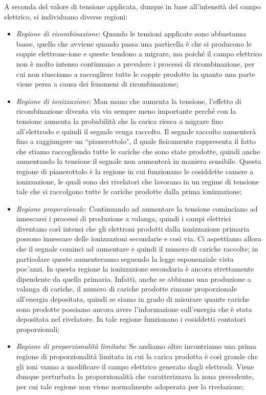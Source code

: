 A seconda del valore di tensione applicata, dunque in base all'intensità del campo elettrico, si individuano diverse regioni:

\begin{itemize}[leftmargin=0.5cm]
   \item \textit{Regione di ricombinazione}: Quando le tensioni applicate sono abbastanza basse, quello che avviene quando passa una particella è che si producono le coppie elettrone-ione e queste tendono a migrare, ma poiché il campo elettrico non è molto intenso continuano a prevalere i processi di ricombinazione, per cui non riusciamo a raccogliere tutte le coppie prodotte in quanto una parte viene persa a causa dei fenomeni di ricombinazione;
   \item \textit{Regione di ionizzazione}: Man mano che aumenta la tensione, l'effetto di ricombinazione diventa via via sempre meno importante perché con la tensione aumenta la probabilità che la carica riesca a migrare fino all'elettrodo e quindi il segnale venga raccolto. Il segnale raccolto aumenterà fino a raggiungere un ``pianerottolo", il quale fisicamente rappresenta il fatto che stiamo raccogliendo tutte le cariche che sono state prodotte, quindi anche aumentando la tensione il segnale non aumenterà in maniera sensibile. Questa regione di pianerottolo è la regione in cui funzionano le cosiddette camere a ionizzazione, le quali sono dei rivelatori che lavorano in un regime di tensione tale che si raccolgono tutte le cariche prodotte dalla prima ionizzazione;
   \item \textit{Regione proporzionale}: Continuando ad aumentare la tensione cominciano ad innescarsi i processi di produzione a valanga, quindi i campi elettrici diventano così intensi che gli elettroni prodotti dalla ionizzazione primaria possono innescare delle ionizzazioni secondarie e così via. Ci aspettiamo allora che il segnale cominci ad aumentare e quindi il numero di cariche raccolte; in particolare queste aumenteranno seguendo la legge esponenziale vista poc'anzi. In questa regione la ionizzazione secondaria è ancora strettamente dipendente
   da quella primaria. Infatti, anche se abbiamo una produzione a valanga di cariche, il numero di cariche prodotte rimane proporzionale all'energia depositata, quindi se siamo in grado di misurare quante cariche sono prodotte possiamo ancora avere l'informazione sull'energia che è stata depositata nel rivelatore. In tale regione funzionano i cosiddetti contatori proporzionali;
   \item \textit{Regione di proporzionalità limitata}: Se andiamo oltre incontriamo una prima regione di proporzionalità limitata in cui la carica prodotta è così grande che gli ioni vanno a modificare il campo elettrico generato dagli elettrodi. Viene dunque perturbata la proporzionalità che caratterizzava la zona precedente, per cui tale regione non viene normalmente adoperata per la rivelazione;

\end{itemize}
